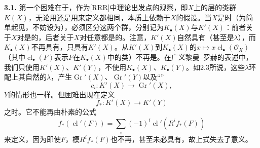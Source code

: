 \textbf{3.1.} 第一个困难在于，作为[RRR]中理论出发点的观察，即$X$上的层的类群$K(X)$，无论用还是用来定义都相同，本质上依赖于$X$的假设。当$X$是时（为简单起见，不妨设为），必须区分这两个群，分别记为$K_{\bullet}(X)$与$K'(X)$：前者关于$X$对是的，后者关于$X$对任意都是的。注意，$K'(X)$自然具有（甚至是$\lambda$），而$K_{\bullet}(X)$不再具有，只具有$K'(X)$。从$K'(X)$到$K_{\bullet}(X)$的$x\longmapsto x\operatorname{cl}_{\bullet}(\mathcal O_X)$（其中$\operatorname{cl}_{\bullet}(F)$表示$F$在$K_{\bullet}(X)$中的类）不再是。在广义黎曼--罗赫的表述中，我们只使用$K'(X)$、$K'(Y)$，不使用$K_{\bullet}(X)$、$K_{\bullet}(Y)$。如2.3所说，这些$\lambda$环配上其自然的$\lambda$，产生$\operatorname{Gr}'(X)$、$\operatorname{Gr}'(Y)$以及“”
\[c_i:K'(X)\longrightarrow\operatorname{Gr}'(X),\]
$Y$的情形也一样。但困难出现在定义
\[f_*:K'(X)\longrightarrow K'(Y)\tag{3.1}\]
之时。它不能再由朴素的公式
\[f_*(\operatorname{cl}'(F))=\sum_i(-1)^i\operatorname{cl}'(R^if_*(F))\]
来定义，因为即使$F$，模$R^if_*(F)$也不再，甚至未必具有，故上式失去了意义。

